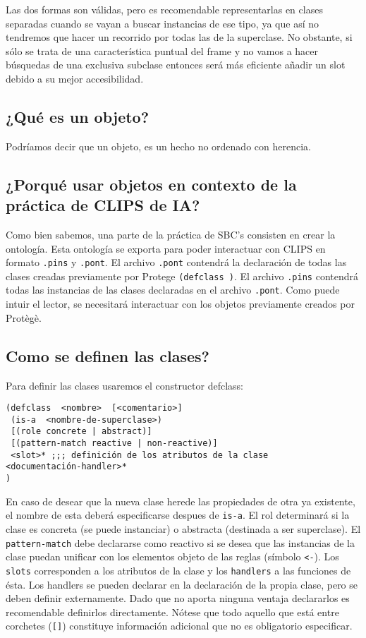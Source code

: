 \documentclass[11pt,svgnames]{scrbook}
\begin{document}
Las dos formas son válidas, pero es recomendable representarlas en clases separadas cuando se vayan a buscar instancias de ese tipo, ya que así no tendremos que hacer un recorrido por todas las de la superclase. No obstante, si sólo se trata de una característica puntual del frame y no vamos a hacer búsquedas de una exclusiva subclase entonces será más eficiente añadir un slot debido a su mejor accesibilidad.



\subsection{¿Qué es un objeto?}

Podríamos decir que un objeto, es un hecho no ordenado  con herencia.

\subsection{¿Porqué usar objetos en contexto de la práctica de
CLIPS de IA?}

Como bien sabemos, una parte de la práctica de SBC's consisten en crear la
ontología. Esta ontología se exporta para poder interactuar con CLIPS en formato
\texttt{.pins} y \texttt{.pont}. El archivo \texttt{.pont} contendrá la
declaración de todas las clases creadas previamente por Protege
\texttt{(defclass )}. El archivo \texttt{.pins} contendrá todas las instancias
de las clases declaradas en el archivo \texttt{.pont}. Como puede intuir el
lector, se necesitará interactuar con los objetos previamente creados por
Protègè.

\subsection{Como se definen las clases?}

Para definir las clases usaremos el constructor defclass:

\begin{verbatim}
(defclass  <nombre>  [<comentario>]
 (is-a  <nombre-de-superclase>)
 [(role concrete | abstract)]
 [(pattern-match reactive | non-reactive)]
 <slot>* ;;; definición de los atributos de la clase
<documentación-handler>*
)\end{verbatim} 

En caso de desear que la nueva clase herede las propiedades de otra ya
existente, el nombre de esta deberá especificarse despues de \texttt{is-a}. El
rol determinará si la clase es concreta (se puede instanciar) o abstracta
(destinada a ser superclase). El \texttt{pattern-match} debe declararse como
reactivo si
se desea que las instancias de la clase puedan unificar con los elementos
objeto
de las reglas (símbolo \texttt{<-}). Los \texttt{slots} corresponden a los
atributos de la
clase y los \texttt{handlers} a las funciones de ésta. Los handlers se pueden
declarar en
la declaración de la propia clase, pero se deben definir externamente. Dado que
no aporta ninguna ventaja declararlos es recomendable definirlos directamente.
Nótese que todo aquello que está entre corchetes (\texttt{[]}) constituye
información adicional que no es obligatorio especificar.
\end{document}
